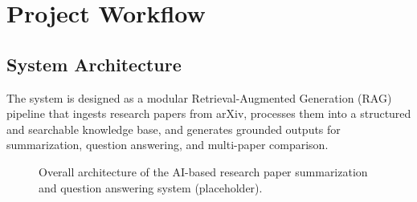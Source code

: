 \chapter{Project Workflow}

\section{System Architecture}
The system is designed as a modular Retrieval-Augmented Generation (RAG) pipeline that ingests research papers from arXiv, processes them into a structured and searchable knowledge base, and generates grounded outputs for summarization, question answering, and multi-paper comparison.

\begin{figure}[H]
    \centering
    \caption{Overall architecture of the AI-based research paper summarization and question answering system (placeholder).}
    \label{fig:system_architecture}
\end{figure}

